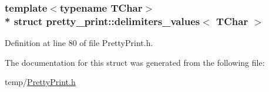 \subsubsection*{template$<$typename T\+Char$>$\\*
struct pretty\+\_\+print\+::delimiters\+\_\+values$<$ T\+Char $>$}



Definition at line 80 of file Pretty\+Print.\+h.



The documentation for this struct was generated from the following file\+:\begin{DoxyCompactItemize}
\item 
temp/\hyperlink{PrettyPrint_8h}{Pretty\+Print.\+h}\end{DoxyCompactItemize}
